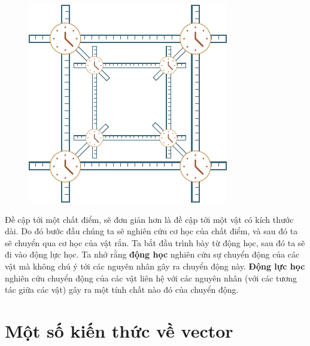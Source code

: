 \begin{figure}[!htb]
	\begin{center}
		\includegraphics[scale=0.95]{figures/ch_01/fig_1_3.pdf}
		\caption[]{}
		\label{fig:1_3}
	\end{center}
\end{figure}

Đề cập tới một chất điểm, sẽ đơn giản hơn là đề cập tới một vật có kích thước dài. Do đó bước đầu chúng ta sẽ nghiên cứu cơ học của chất điểm, và sau đó ta sẽ chuyển qua cơ học của vật rắn. Ta bắt đầu trình bày từ động học, sau đó ta sẽ đi vào động lực học. Ta nhớ rằng \textbf{động học} nghiên cứu sự chuyển động của các vật mà không chú ý tới các nguyên nhân gây ra chuyển động này. \textbf{Động lực học} nghiên cứu chuyển động của các vật liên hệ với các nguyên nhân (với các tương tác giữa các vật) gây ra một tính chất nào đó của chuyển động.

\section{Một số kiến thức về vector}\label{sec:1_2}

